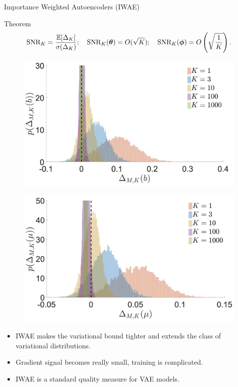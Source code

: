 \begin{frame}{Importance Weighted Autoencoders (IWAE)}
	\begin{block}{Theorem}
		\vspace{-0.5cm}
		\[
		\text{SNR}_K = \frac{\mathbb{E} [\Delta_K]}{\sigma(\Delta_K)}; \quad
		\text{SNR}_K(\boldsymbol{\theta}) = O(\sqrt{K}); \quad 
		\text{SNR}_K(\boldsymbol{\phi}) = O\left(\sqrt{\frac{1}{K}}\right).
		\]
		\vspace{-0.8cm}
	\end{block}
	\begin{minipage}[t]{0.5\columnwidth}
		\begin{figure}[h]
			\centering
			\includegraphics[width=1.\linewidth]{figs/IWAE_SNR_1.png}
		\end{figure}
	\end{minipage}%
	\begin{minipage}[t]{0.5\columnwidth}
		\begin{figure}[h]
			\centering
			\includegraphics[width=1.\linewidth]{figs/IWAE_SNR_2.png}
		\end{figure}
	\end{minipage}
	\begin{itemize}
		\item IWAE makes the variational bound tighter and extends the class of variational distributions.
		\item Gradient signal becomes really small, training is complicated.
		\item IWAE is a standard quality measure for VAE models.
	\end{itemize}
\end{frame}
